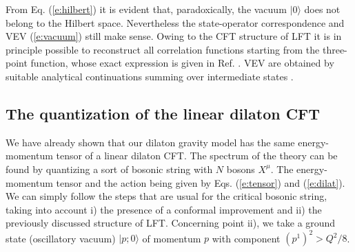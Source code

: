 \documentclass[a4paper,aps,prd,twocolumn,groupedaddress]{revtex4}
\begin{document}
From Eq. (\ref{e:hilbert}) it is evident that, paradoxically, the
vacuum $|0\rangle$ does not belong to the Hilbert space.  Nevertheless
the state-operator correspondence and VEV (\ref{e:vacuum}) still make
sense. Owing to the CFT structure of LFT it is in principle
possible to reconstruct all correlation functions starting from the
three-point function, whose exact expression is given in
Ref. \cite{do}. VEV are obtained by suitable analytical continuations
summing over intermediate states \cite{tesc}.

\subsection{The quantization of the linear dilaton CFT}

We have already shown that our dilaton gravity model has the same
energy-momentum tensor of a linear dilaton CFT.  The spectrum of the
theory can be found by quantizing a sort of bosonic string with $N$
bosons $X^\mu$. The energy-momentum tensor and the action being given
by Eqs. (\ref{e:tensor}) and (\ref{e:dilat}).  We can simply follow
the steps that are usual for the critical bosonic string, taking into
account i) the presence of a conformal improvement and ii) the
previously discussed structure of LFT.  Concerning point ii), we take
a ground state (oscillatory vacuum) $|p;0\rangle$ of momentum $p$ with
component $(p^1)^2 > Q^2/8$.
\end{document}
